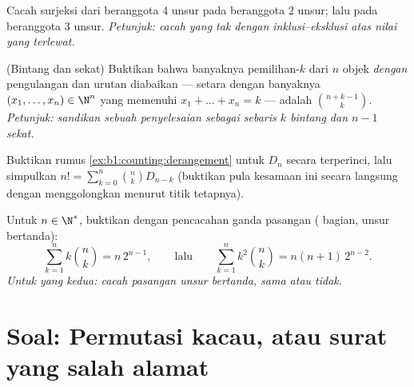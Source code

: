 \begin{exercise}[$\star\star$]\label{exo:b1:counting:9}
Cacah surjeksi dari  beranggota $4$ unsur pada  beranggota $2$
unsur; lalu pada  beranggota $3$ unsur. \emph{Petunjuk: cacah
 yang tak  dengan inklusi--eksklusi atas nilai yang terlewat.}
\end{exercise}

\begin{exercise}[$\star\star$]\label{exo:b1:counting:10}
(Bintang dan sekat) Buktikan bahwa banyaknya pemilihan-$k$ dari $n$
objek \emph{dengan} pengulangan dan urutan diabaikan --- setara dengan
banyaknya $(x_1, \dots, x_n) \in \N^n$ yang memenuhi $x_1 + \dots + x_n = k$
--- adalah $\binom{n + k - 1}{k}$. \emph{Petunjuk: sandikan sebuah penyelesaian sebagai sebaris
$k$ bintang dan $n - 1$ sekat.}
\end{exercise}

\begin{exercise}[$\star\star\star$]\label{exo:b1:counting:11}
Buktikan rumus \cref{ex:b1:counting:derangement} untuk $D_n$ secara
terperinci, lalu simpulkan $n! = \sum_{k=0}^{n} \binom{n}{k} D_{n-k}$ (buktikan pula
kesamaan ini secara langsung dengan menggolongkan  menurut
 titik tetapnya).
\end{exercise}

\begin{exercise}[$\star\star\star$]\label{exo:b1:counting:12}
Untuk $n \in \N^*$, buktikan dengan pencacahan ganda pasangan ( bagian, unsur
bertanda):
\[
\sum_{k=1}^{n} k \binom{n}{k} = n\, 2^{n-1},
\qquad\text{lalu}\qquad
\sum_{k=1}^{n} k^2 \binom{n}{k} = n(n+1)\, 2^{n-2} .
\]
\emph{Untuk yang kedua: cacah pasangan unsur bertanda, sama atau tidak.}
\end{exercise}

\section{Soal: Permutasi kacau, atau surat yang salah alamat}

